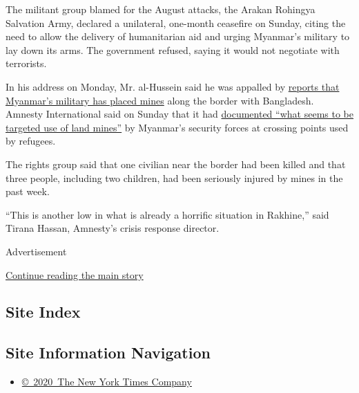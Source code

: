 The militant group blamed for the August attacks, the Arakan Rohingya
Salvation Army, declared a unilateral, one-month ceasefire on Sunday,
citing the need to allow the delivery of humanitarian aid and urging
Myanmar's military to lay down its arms. The government refused, saying
it would not negotiate with terrorists.

In his address on Monday, Mr. al-Hussein said he was appalled by
\href{https://www.nytimes3xbfgragh.onion/2017/09/06/world/americas/bangladesh-rohingya-land-mines.html}{reports
that Myanmar's military has placed mines} along the border with
Bangladesh. Amnesty International said on Sunday that it had
\href{https://www.amnesty.org/en/latest/news/2017/09/myanmar-army-landmines-along-border-with-bangladesh-pose-deadly-threat-to-fleeing-rohingya/}{documented
``what seems to be targeted use of land mines''} by Myanmar's security
forces at crossing points used by refugees.

The rights group said that one civilian near the border had been killed
and that three people, including two children, had been seriously
injured by mines in the past week.

``This is another low in what is already a horrific situation in
Rakhine,'' said Tirana Hassan, Amnesty's crisis response director.

Advertisement

\protect\hyperlink{after-bottom}{Continue reading the main story}

\hypertarget{site-index}{%
\subsection{Site Index}\label{site-index}}

\hypertarget{site-information-navigation}{%
\subsection{Site Information
Navigation}\label{site-information-navigation}}

\begin{itemize}
\tightlist
\item
  \href{https://help.nytimes3xbfgragh.onion/hc/en-us/articles/115014792127-Copyright-notice}{©~2020~The
  New York Times Company}
\end{itemize}

